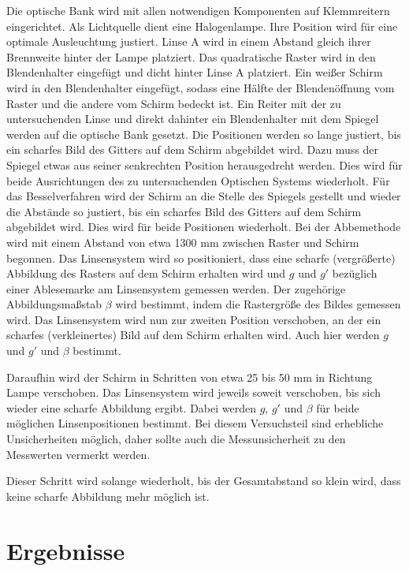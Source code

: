 \documentclass[11pt, a4paper]{article}
\begin{document}
    Die optische Bank wird mit allen notwendigen Komponenten auf Klemmreitern eingerichtet. Als Lichtquelle dient eine Halogenlampe. Ihre Position wird für eine optimale Ausleuchtung justiert. Linse A wird in einem Abstand gleich ihrer Brennweite hinter der Lampe platziert. Das quadratische Raster wird in den Blendenhalter eingefügt und dicht hinter Linse A platziert. Ein weißer Schirm wird in den Blendenhalter eingefügt, sodass eine Hälfte der Blendenöffnung vom Raster und die andere vom Schirm bedeckt ist. Ein Reiter mit der zu untersuchenden Linse und direkt dahinter ein Blendenhalter mit dem Spiegel werden auf die optische Bank gesetzt. Die Positionen werden so lange justiert, bis ein scharfes Bild des Gitters auf dem Schirm abgebildet wird. Dazu muss der Spiegel etwas aus seiner senkrechten Position herausgedreht werden. Dies wird für beide Ausrichtungen des zu untersuchenden Optischen Systems wiederholt.
    Für das Besselverfahren wird der Schirm an die Stelle des Spiegels gestellt und wieder die Abstände so justiert, bis ein scharfes Bild des Gitters auf dem Schirm abgebildet wird. Dies wird für beide Positionen wiederholt.
    Bei der Abbemethode wird mit einem Abstand von etwa 1300 mm zwischen Raster und Schirm begonnen. Das Linsensystem wird so positioniert, dass eine scharfe (vergrößerte) Abbildung des Rasters auf dem Schirm erhalten wird und $g$ und $g'$ bezüglich einer Ablesemarke am Linsensystem gemessen werden. Der zugehörige Abbildungsmaßstab $\beta$ wird bestimmt, indem die Rastergröße des Bildes gemessen wird. Das Linsensystem wird nun zur zweiten Position verschoben, an der ein scharfes (verkleinertes) Bild auf dem Schirm erhalten wird. Auch hier werden $g$ und $g'$ und $\beta$ bestimmt.

    Daraufhin wird der Schirm in Schritten von etwa 25 bis 50 mm in Richtung Lampe verschoben. Das Linsensystem wird jeweils soweit verschoben, bis sich wieder eine scharfe Abbildung ergibt. Dabei werden $g$, $g'$ und $\beta$ für beide möglichen Linsenpositionen bestimmt. Bei diesem Versuchsteil sind erhebliche Unsicherheiten möglich, daher sollte auch die Messunsicherheit zu den Messwerten vermerkt werden.

    Dieser Schritt wird solange wiederholt, bis der Gesamtabstand so klein wird, dass keine scharfe Abbildung mehr möglich ist.



    \section{Ergebnisse}
\end{document}
